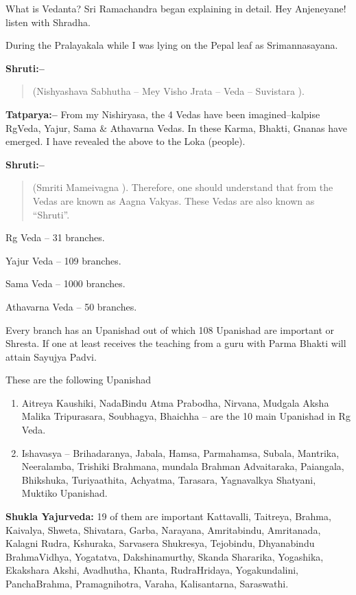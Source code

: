 What is Vedanta? Sri Ramachandra began explaining in detail. Hey Anjeneyane! listen with Shradha.

During the Pralayakala while I was lying on the Pepal leaf as Srimannasayana.

\textbf{Shruti:–}

\begin{verse}
(Nishyashava Sabhutha – Mey Visho Jrata – Veda – Suvistara ).
\end{verse}

\textbf{Tatparya:–} From my Nishiryasa, the 4 Vedas have been imagined–kalpise RgVeda, Yajur, Sama \& Athavarna Vedas. In these Karma, Bhakti, Gnanas have emerged. I have revealed the above to the Loka (people).

\textbf{Shruti:–}

\begin{verse}
(Smriti Mameivagna ). Therefore, one should understand that from the Vedas are known as Aagna Vakyas. These Vedas are also known as “Shruti”.
\end{verse}

Rg Veda – 31 branches.

Yajur Veda – 109 branches.

Sama Veda – 1000 branches.

Athavarna Veda – 50 branches.

Every branch has an Upanishad out of which 108 Upanishad are important or Shresta. If one at least receives the teaching from a guru with Parma Bhakti will attain Sayujya Padvi.

These are the following Upanishad

\begin{enumerate}
\item Aitreya Kaushiki, NadaBindu Atma Prabodha, Nirvana, Mudgala Aksha Malika Tripurasara, Soubhagya, Bhaichha – are the 10 main Upanishad in Rg Veda.

 \item Ishavasya – Brihadaranya, Jabala, Hamsa, Parmahamsa, Subala, Mantrika, Neeralamba, Trishiki Brahmana, mundala Brahman Advaitaraka, Paiangala, Bhikshuka, Turiyaathita, Achyatma, Tarasara, Yagnavalkya Shatyani, Muktiko Upanishad.

\end{enumerate}

\textbf{Shukla Yajurveda:} 19 of them are important Kattavalli, Taitreya, Brahma, Kaivalya, Shweta, Shivatara, Garba, Narayana, Amritabindu, Amritanada, Kalagni Rudra, Kshuraka, Sarvasera Shukresya, Tejobindu, Dhyanabindu BrahmaVidhya, Yogatatva, Dakshinamurthy, Skanda Shararika, Yogashika, Ekakshara Akshi, Avadhutha, Khanta, RudraHridaya, Yogakundalini, PanchaBrahma, Pramagnihotra, Varaha, Kalisantarna, Saraswathi.

